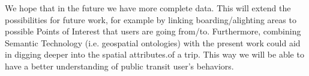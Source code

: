 \documentclass{article}
\begin{document}
We hope that in the future we have more complete data. This will extend the possibilities for future work, for example by linking boarding/alighting areas to possible Points of Interest that users are going from/to. Furthermore, combining Semantic Technology (i.e. geospatial ontologies) with the present work could aid in digging deeper into the spatial attributes.of a trip. This way we will be able to have a better understanding of public transit user's behaviors. 


\newpage
{}

\end{document}
